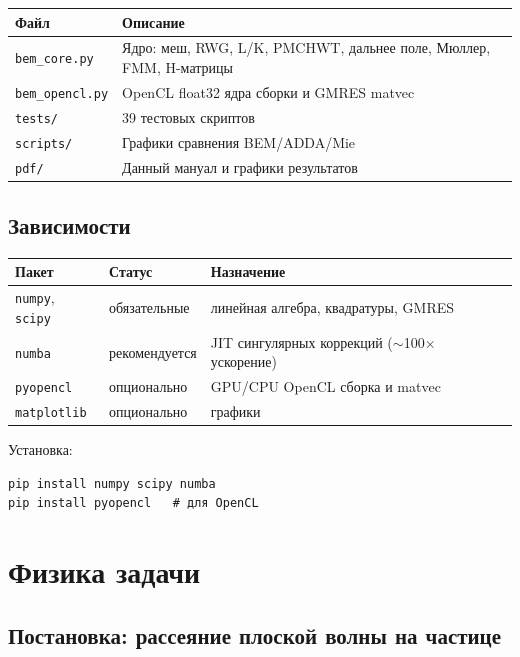 \documentclass[12pt,a4paper]{article}
\begin{document}
\begin{center}
\begin{tabular}{ll}
\toprule
Файл & Описание \\
\midrule
\texttt{bem\_core.py} & Ядро: меш, RWG, L/K, PMCHWT, дальнее поле, Мюллер, FMM, H-матрицы \\
\texttt{bem\_opencl.py} & OpenCL float32 ядра сборки и GMRES matvec \\
\texttt{tests/} & 39 тестовых скриптов \\
\texttt{scripts/} & Графики сравнения BEM/ADDA/Mie \\
\texttt{pdf/} & Данный мануал и графики результатов \\
\bottomrule
\end{tabular}
\end{center}

\subsection{Зависимости}

\begin{center}
\begin{tabular}{lll}
\toprule
Пакет & Статус & Назначение \\
\midrule
\texttt{numpy}, \texttt{scipy} & обязательные & линейная алгебра, квадратуры, GMRES \\
\texttt{numba} & рекомендуется & JIT сингулярных коррекций ($\sim$100$\times$ ускорение) \\
\texttt{pyopencl} & опционально & GPU/CPU OpenCL сборка и matvec \\
\texttt{matplotlib} & опционально & графики \\
\bottomrule
\end{tabular}
\end{center}

Установка:
\begin{lstlisting}
pip install numpy scipy numba
pip install pyopencl   # для OpenCL
\end{lstlisting}


\section{Физика задачи}

\subsection{Постановка: рассеяние плоской волны на частице}
\end{document}
